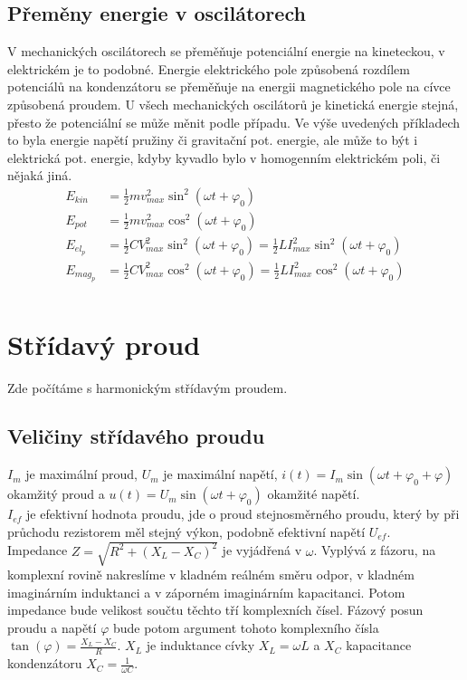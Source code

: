 \documentclass[titlepage]{book}
\begin{document}
\section{Přeměny energie v oscilátorech}
V mechanických oscilátorech se přeměňuje potenciální energie na kineteckou, v elektrickém je to podobné. Energie elektrického pole způsobená rozdílem potenciálů na kondenzátoru se přeměňuje na energii magnetického pole na cívce způsobená proudem. U všech mechanických oscilátorů je kinetická energie stejná, přesto že potenciální se může měnit podle případu. Ve výše uvedených příkladech to byla energie napětí pružiny či gravitační pot. energie, ale může to být i elektrická pot. energie, kdyby kyvadlo bylo v homogenním elektrickém poli, či nějaká jiná.\\
\begin{align}
E_{kin} &= \frac{1}{2} m v_{max}^2 \sin^2(\omega t + \varphi_0)\\
E_{pot} &= \frac{1}{2} m v_{max}^2 \cos^2(\omega t + \varphi_0)\\
E_{el_p} &= \frac{1}{2} C V_{max}^2 \sin^2(\omega t + \varphi_0) = \frac{1}{2} L I_{max}^2 \sin^2(\omega t + \varphi_0)\\
E_{mag_p} &= \frac{1}{2} C V_{max}^2 \cos^2(\omega t + \varphi_0) = \frac{1}{2} L I_{max}^2 \cos^2(\omega t + \varphi_0)\\
\end{align}
\chapter{Střídavý proud}
Zde počítáme s harmonickým střídavým proudem.
\section{Veličiny střídavého proudu}
$I_m$ je maximální proud, $U_m$ je maximální napětí, $i(t) = I_m \sin(\omega t + \varphi_0 + \varphi)$ okamžitý proud a $u(t) = U_m \sin(\omega t + \varphi_0)$ okamžité napětí.\\
$I_{ef}$ je efektivní hodnota proudu, jde o proud stejnosměrného proudu, který by při průchodu rezistorem měl stejný výkon, podobně efektivní napětí $U_{ef}$.\\
Impedance $Z = \sqrt{R^2 + (X_L - X_C)^2}$ je vyjádřená v $\omega$. Vyplývá z fázoru, na komplexní rovině nakreslíme v kladném reálném směru odpor, v kladném imaginárním induktanci a v záporném imaginárním kapacitanci. Potom impedance bude velikost součtu těchto tří komplexních čísel. Fázový posun proudu a napětí $\varphi$ bude potom argument tohoto komplexního čísla $\tan(\varphi) = \frac{X_L - X_C}{R}$. $X_L$ je induktance cívky $X_L = \omega L$ a $X_C$ kapacitance kondenzátoru $X_C = \frac{1}{\omega C}$.\\
\end{document}
